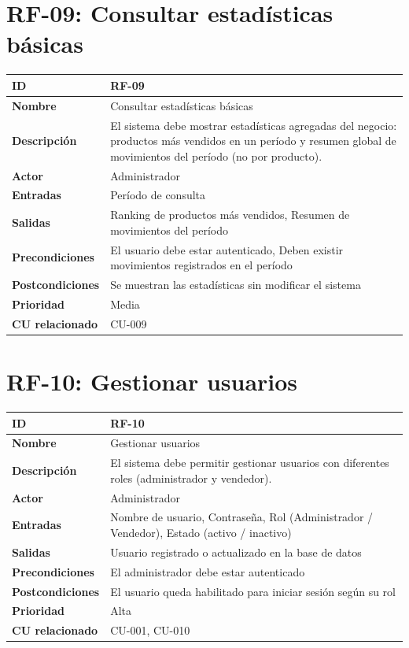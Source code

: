 \documentclass{article}
\begin{document}
\section*{RF-09: Consultar estadísticas básicas}
\begin{center}
\renewcommand{\arraystretch}{1.4}
\begin{tabular}{|L{4cm}|L{12cm}|}
\hline
\textbf{ID} & RF-09 \\
\hline
\textbf{Nombre} & Consultar estadísticas básicas \\
\hline
\textbf{Descripción} & El sistema debe mostrar estadísticas agregadas del negocio: productos más vendidos en un período y resumen global de movimientos del período (no por producto). \\
\hline
\textbf{Actor} & Administrador \\
\hline
\textbf{Entradas} & Período de consulta \\
\hline
\textbf{Salidas} & Ranking de productos más vendidos, Resumen de movimientos del período \\
\hline
\textbf{Precondiciones} & El usuario debe estar autenticado, Deben existir movimientos registrados en el período \\
\hline
\textbf{Postcondiciones} & Se muestran las estadísticas sin modificar el sistema \\
\hline
\textbf{Prioridad} & Media \\
\hline
\textbf{CU relacionado} & CU-009 \\
\hline
\end{tabular}
\end{center}

\section*{RF-10: Gestionar usuarios}
\begin{center}
\renewcommand{\arraystretch}{1.4}
\begin{tabular}{|L{4cm}|L{12cm}|}
\hline
\textbf{ID} & RF-10 \\
\hline
\textbf{Nombre} & Gestionar usuarios \\
\hline
\textbf{Descripción} & El sistema debe permitir gestionar usuarios con diferentes roles (administrador y vendedor). \\
\hline
\textbf{Actor} & Administrador \\
\hline
\textbf{Entradas} & Nombre de usuario, Contraseña, Rol (Administrador / Vendedor), Estado (activo / inactivo) \\
\hline
\textbf{Salidas} & Usuario registrado o actualizado en la base de datos \\
\hline
\textbf{Precondiciones} & El administrador debe estar autenticado \\
\hline
\textbf{Postcondiciones} & El usuario queda habilitado para iniciar sesión según su rol \\
\hline
\textbf{Prioridad} & Alta \\
\hline
\textbf{CU relacionado} & CU-001, CU-010 \\
\hline
\end{tabular}
\end{center}
\end{document}
